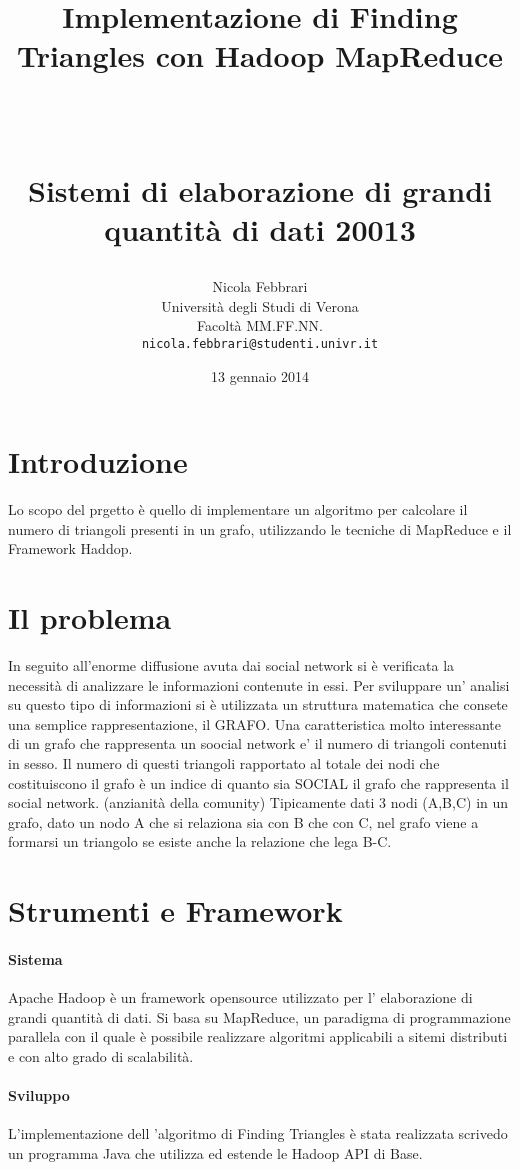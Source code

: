 \documentclass[paper=a4, fontsize=11pt]{scrartcl}	%
\title{ \vspace{-1in} 	\usefont{OT1}{bch}{b}{n}
		\huge \strut Implementazione di Finding Triangles con Hadoop MapReduce\strut \\
		\Large \bfseries \strut Sistemi di elaborazione di grandi quantit\`a di dati 20013 \strut
}
\author{ 									\usefont{OT1}{bch}{m}{n}
        Nicola Febbrari\\		\usefont{OT1}{bch}{m}{n}
        Universit\`a degli Studi di Verona\\	\usefont{OT1}{bch}{m}{n}
        Facolt\`a MM.FF.NN.\\
        \texttt{nicola.febbrari@studenti.univr.it}
}
\date{13 gennaio 2014}
\numberwithin{equation}{section}															%
\numberwithin{figure}{section}																%
\numberwithin{table}{section}																%
\begin{document}
\maketitle
\section{Introduzione}
Lo scopo del prgetto \`e quello di implementare un algoritmo per calcolare il numero di triangoli presenti in un grafo, utilizzando le tecniche di MapReduce e il Framework Haddop.


\section{Il problema}
In seguito all'enorme diffusione avuta dai social network si \`e verificata la necessit\`a di analizzare le informazioni contenute in essi. Per sviluppare un' analisi su questo tipo di informazioni si \`e utilizzata un struttura matematica che consete una semplice rappresentazione, il GRAFO.
Una caratteristica molto interessante di un grafo che rappresenta un soocial network e' il numero di triangoli contenuti in sesso. 
Il numero di questi triangoli rapportato al totale dei nodi che costituiscono il grafo è un indice di quanto sia SOCIAL il grafo che rappresenta il social network. (anzianità della comunity)
Tipicamente dati 3 nodi (A,B,C) in un grafo, dato un nodo  A che si relaziona sia con B che con C, nel grafo viene a formarsi un triangolo se esiste anche la relazione che lega B-C.

\section{Strumenti e Framework}
\paragraph{Sistema}
Apache Hadoop \`e un framework opensource utilizzato per l' elaborazione di grandi quantit\`a di dati. 
Si basa su MapReduce, un paradigma di programmazione parallela con il quale è possibile realizzare algoritmi applicabili a sitemi distributi e con alto grado di scalabilit\`a.

\paragraph{Sviluppo}
L'implementazione dell 'algoritmo di Finding Triangles  è stata realizzata scrivedo un programma Java che utilizza ed estende le Hadoop API di Base.
\end{document}
